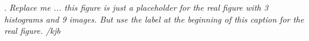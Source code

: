 \label{fig:BlueGreenRed}. \textit{Replace me ... this figure is just a placeholder for the real figure with 3 histograms and 9 images. But use the label at the beginning of this caption for the real figure. /kjb}